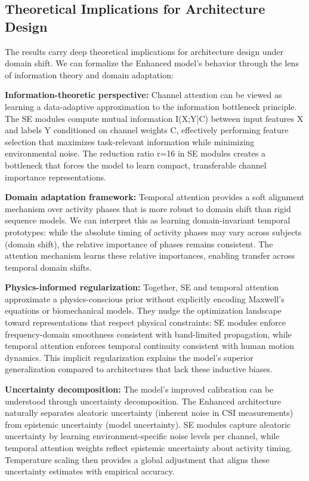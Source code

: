 \documentclass[journal]{IEEEtran}
\begin{document}
\subsection{Theoretical Implications for Architecture Design}
The results carry deep theoretical implications for architecture design under domain shift. We can formalize the Enhanced model's behavior through the lens of information theory and domain adaptation:

\textbf{Information-theoretic perspective:} Channel attention can be viewed as learning a data-adaptive approximation to the information bottleneck principle. The SE modules compute mutual information I(X;Y|C) between input features X and labels Y conditioned on channel weights C, effectively performing feature selection that maximizes task-relevant information while minimizing environmental noise. The reduction ratio r=16 in SE modules creates a bottleneck that forces the model to learn compact, transferable channel importance representations.

\textbf{Domain adaptation framework:} Temporal attention provides a soft alignment mechanism over activity phases that is more robust to domain shift than rigid sequence models. We can interpret this as learning domain-invariant temporal prototypes: while the absolute timing of activity phases may vary across subjects (domain shift), the relative importance of phases remains consistent. The attention mechanism learns these relative importances, enabling transfer across temporal domain shifts.

\textbf{Physics-informed regularization:} Together, SE and temporal attention approximate a physics-conscious prior without explicitly encoding Maxwell's equations or biomechanical models. They nudge the optimization landscape toward representations that respect physical constraints: SE modules enforce frequency-domain smoothness consistent with band-limited propagation, while temporal attention enforces temporal continuity consistent with human motion dynamics. This implicit regularization explains the model's superior generalization compared to architectures that lack these inductive biases.

\textbf{Uncertainty decomposition:} The model's improved calibration can be understood through uncertainty decomposition. The Enhanced architecture naturally separates aleatoric uncertainty (inherent noise in CSI measurements) from epistemic uncertainty (model uncertainty). SE modules capture aleatoric uncertainty by learning environment-specific noise levels per channel, while temporal attention weights reflect epistemic uncertainty about activity timing. Temperature scaling then provides a global adjustment that aligns these uncertainty estimates with empirical accuracy.
\end{document}
